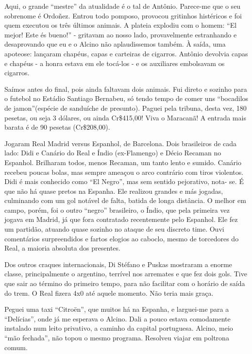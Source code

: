 Aqui, o grande ``mestre'' da atualidade é o tal de Antônio. Parece-me que o seu sobrenome é Ordoñez. Entrou todo pomposo, provocou gritinhos histéricos e foi quem executou os três últimos animais. A plateia explodiu com o homem: ``El mejor! Este és bueno!'' - gritavam ao nosso lado, provavelmente estranhando e desaprovando que eu e o Alcino não aplaudissemos também. À saída, uma apoteose: lançaram chapéus, capas e carteiras de cigarros. Antônio devolvia capas e chapéus - a honra estava em ele tocá-los - e os auxiliares embolsavam os cigarros.

Saímos antes do final, pois ainda faltavam dois animais. Fui direto e sozinho para o futebol no Estádio Santiago Bernabeu, só tendo tempo de comer uns ``bocadilos de jamon''(espécie de sanduíche de presunto). Paguei pela tribuna, desta vez, 180 pesetas, ou seja 3 dólares, ou ainda Cr\$415,00! Viva o Maracanã! A entrada mais barata é de 90 pesetas (Cr\$208,00).

Jogaram Real Madrid versus Espanhol, de Barcelona. Dois brasileiros de cada lado: Didi e Canário do Real e Índio (ex-Flamengo) e Décio Recaman no Espanhol. Brilharam todos, menos Recaman, um tanto lento e sumido. Canário recebeu poucas bolas, mas sempre ameaçou o arco contrário com tiros violentos. Didi é mais conhecido como ``El Negro'', mas sem sentido pejorativo, nota- se. É que não há quase pretos na Espanha. Ele realizou grandes e más jogadas, culminando com um gol notável de falta, batida de longa distância. O melhor em campo, porém, foi o outro ``negro'' brasileiro, o Índio, que pela primeira vez jogava em Madrid, já que fora contratado recentemente pelo Espanhol. Ele fez um partidão, atuando quase sozinho no ataque de seu discreto time. Ouvi comentários surpreendidos e fartos elogios ao caboclo, mesmo de torcedores do Real, a maioria absoluta dos presentes.

Dos outros craques internacionais, Di Stéfano e Puskas mostraram a enorme classe, principalmente o argentino, terrível nos arremates e que fez dois gols. Tive que sair ao término do primeiro tempo, para não facilitar com o horário de saída do trem. O Real fizera 4x0 até aquele momento. Não teria mais graça.

Peguei uma taxi ``Citroën'', que muitos há na Espanha, e larguei-me para a ``Delícias'', onde já me esperava o Alcino. Dali a pouco estava comodamente instalado num leito privativo, a caminho da capital portuguesa. Alcino, meio ``mão fechada'', não topou o mesmo programa. Resolveu viajar em poltrona comum.

